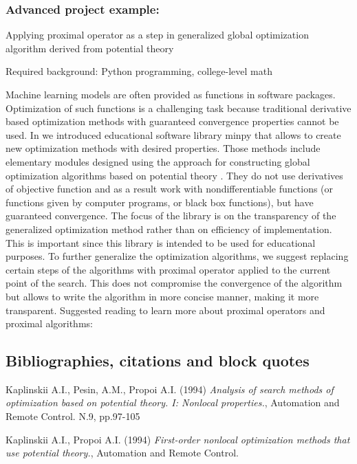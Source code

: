 {{{      \subsubsection{Advanced project example: }

Applying proximal operator as a step in generalized global optimization algorithm derived from potential theory


Required background: Python programming, college-level math

Machine learning models are often provided as functions in software packages. Optimization of such functions is a challenging task because traditional derivative based optimization methods with guaranteed convergence properties cannot be used. In \cite{MP} we introduced educational software library minpy that allows to create new optimization methods with desired properties. Those methods include elementary modules designed using the approach for constructing global optimization algorithms based on potential theory \cite{KAP1,KAP2}. They do not use derivatives of objective function and as a result work with nondifferentiable functions (or functions given by computer programs, or black box functions), but have guaranteed convergence. The focus of the library is on the transparency of the generalized optimization method rather than on efficiency of implementation. This is important since this library is intended to be used for educational purposes. To further generalize the optimization algorithms, we suggest replacing certain steps of the algorithms with proximal operator applied to the current point of the search. This does not compromise the convergence of the algorithm  \cite{KAP3}  but allows to write the algorithm in more concise manner, making it more transparent. Suggested reading to learn more about proximal operators and proximal algorithms: \cite{LAKLG,RGMN,SGFLZ}


\subsection{Bibliographies, citations and block quotes \label{bibliographies-citations-and-block-quotes}}

 \begin{thebibliography}{9}
Kaplinskii A.I., Pesin, A.M., Propoi A.I. (1994) \emph{ Analysis of search methods of optimization based on potential theory. I: Nonlocal properties.}, Automation and Remote Control. N.9, pp.97-105 

Kaplinskii A.I., Propoi A.I. (1994) \emph{First-order nonlocal optimization methods that use potential theory.}, Automation and Remote Control. 


\end{thebibliography}}}}
